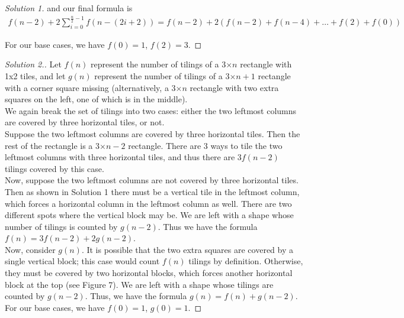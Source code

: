 \documentclass[12pt]{article}
\begin{document}
\begin{myprob}{}{}
\begin{proof}[Solution 1]
            and our final formula is
            \begin{align*}
                f(n-2)+2\sum_{i=0}^{\frac{n}{2}-1}f(n-(2i+2))=f(n-2)+2(f(n-2)+f(n-4)+\dots+f(2)+f(0))
            \end{align*}

            For our base cases, we have $f(0)=1$, $f(2)=3$.
        \end{proof}
        \begin{proof}[Solution 2.]
            Let $f(n)$ represent the number of tilings of a 3$\times n$ rectangle with 1x2 tiles, and let $g(n)$ represent the number of tilings of a 3$\times n+1$ rectangle with a corner square missing (alternatively, a 3$\times n$ rectangle with two extra squares on the left, one of which is in the middle).\\

            We again break the set of tilings into two cases: either the two leftmost columns are covered by three horizontal tiles, or not.\\

            Suppose the two leftmost columns are covered by three horizontal tiles. Then the rest of the rectangle is a 3$\times n-2$ rectangle. There are 3 ways to tile the two leftmost columns with three horizontal tiles, and thus there are $3f(n-2)$ tilings covered by this case.\\

            Now, suppose the two leftmost columns are not covered by three horizontal tiles. Then as shown in Solution 1 there must be a vertical tile in the leftmost column, which forces a horizontal column in the leftmost column as well. There are two different spots where the vertical block may be. We are left with a shape whose number of tilings is counted by $g(n-2)$. Thus we have the formula $f(n)=3f(n-2)+2g(n-2)$.\\

            Now, consider $g(n)$. It is possible that the two extra squares are covered by a single vertical block; this case would count $f(n)$ tilings by definition. Otherwise, they must be covered by two horizontal blocks, which forces another horizontal block at the top (see Figure 7). We are left with a shape whose tilings are counted by $g(n-2)$. Thus, we have the formula $g(n)=f(n)+g(n-2)$.\\

            For our base cases, we have $f(0)=1$, $g(0)=1$.
        \end{proof}
    \end{myprob}
\end{document}
